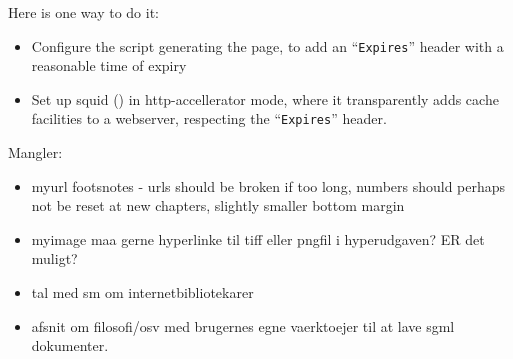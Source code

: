 \documentclass[11pt,a4paper]{book}
\begin{document}
Here is one way to do it:

\begin{itemize}
\item Configure the script generating the page, to add an
  ``\texttt{Expires}'' header with a reasonable time of expiry
\item Set up squid () in http-accellerator mode, where
  it transparently adds cache facilities to a webserver, respecting
  the ``\texttt{Expires}'' header.
\end{itemize}


Mangler:

\begin{itemize}
\item myurl footsnotes - urls should be broken if too long, numbers
  should perhaps not be reset at new chapters, slightly smaller bottom
  margin 
  
  
  
\item myimage maa gerne hyperlinke til tiff eller pngfil i
  hyperudgaven?  ER det muligt?
\item tal med sm om internetbibliotekarer
\item afsnit om filosofi/osv med brugernes egne vaerktoejer til at
  lave sgml dokumenter.

  
\end{itemize}
\end{document}
